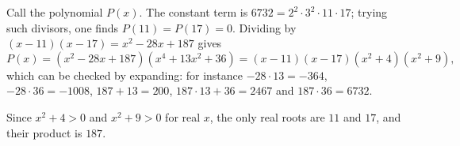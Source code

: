 Call the polynomial $P(x)$. The constant term is $6732=2^2\cdot3^2\cdot11\cdot17$; trying such divisors, one finds $P(11)=P(17)=0$. Dividing by $(x-11)(x-17)=x^2-28x+187$ gives
\[P(x)=\left(x^2-28x+187\right)\left(x^4+13x^2+36\right)=(x-11)(x-17)\left(x^2+4\right)\left(x^2+9\right),\]
which can be checked by expanding: for instance $-28\cdot13=-364$, $-28\cdot36=-1008$, $187+13=200$, $187\cdot13+36=2467$ and $187\cdot36=6732$.

Since $x^2+4>0$ and $x^2+9>0$ for real $x$, the only real roots are $11$ and $17$, and their product is $\boxed{187}$.
